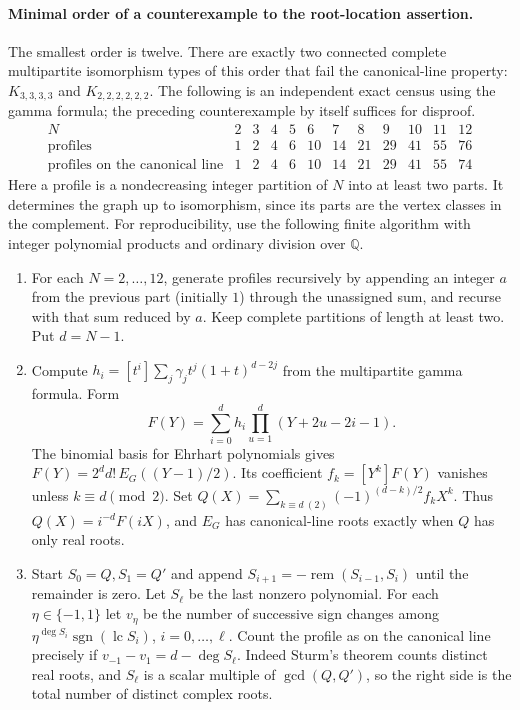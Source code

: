 \documentclass[11pt,a4paper]{article}
\theoremstyle{definition}\newtheorem{problem}[theorem]{Problem}
\begin{document}
\paragraph{Minimal order of a counterexample to the root-location assertion.}
The smallest order is twelve. There are exactly two connected complete multipartite isomorphism types of this order that fail the canonical-line property: $K_{3,3,3,3}$ and $K_{2,2,2,2,2,2}$. The following is an independent exact census using the gamma formula; the preceding counterexample by itself suffices for disproof.
\[
\begin{array}{c|rrrrrrrrrrr}
N&2&3&4&5&6&7&8&9&10&11&12\\\hline
\text{profiles}&1&2&4&6&10&14&21&29&41&55&76\\
\text{profiles on the canonical line}&1&2&4&6&10&14&21&29&41&55&74
\end{array}
\]
Here a profile is a nondecreasing integer partition of $N$ into at least two parts. It determines the graph up to isomorphism, since its parts are the vertex classes in the complement. For reproducibility, use the following finite algorithm with integer polynomial products and ordinary division over $\mathbb Q$.

\begin{enumerate}
\item For each $N=2,\ldots,12$, generate profiles recursively by appending an integer $a$ from the previous part (initially $1$) through the unassigned sum, and recurse with that sum reduced by $a$. Keep complete partitions of length at least two. Put $d=N-1$.
\item Compute $h_i=[t^i]\sum_j\gamma_jt^j(1+t)^{d-2j}$ from the multipartite gamma formula. Form
\[
 F(Y)=\sum_{i=0}^d h_i\prod_{u=1}^d(Y+2u-2i-1).
\]
The binomial basis for Ehrhart polynomials gives $F(Y)=2^d d!\,E_G((Y-1)/2)$. Its coefficient $f_k=[Y^k]F(Y)$ vanishes unless $k\equiv d\pmod 2$. Set $Q(X)=\sum_{k\equiv d\ (2)}(-1)^{(d-k)/2} f_kX^k$. Thus $Q(X)=i^{-d}F(iX)$, and $E_G$ has canonical-line roots exactly when $Q$ has only real roots.
\item Start $S_0=Q,S_1=Q'$ and append $S_{i+1}=-\operatorname{rem}(S_{i-1},S_i)$ until the remainder is zero. Let $S_\ell$ be the last nonzero polynomial. For each $\eta\in\{-1,1\}$ let $v_\eta$ be the number of successive sign changes among $\eta^{\deg S_i}\operatorname{sgn}(\operatorname{lc}S_i)$, $i=0,\ldots,\ell$. Count the profile as on the canonical line precisely if $v_{-1}-v_1=d-\deg S_\ell$. Indeed Sturm's theorem counts distinct real roots, and $S_\ell$ is a scalar multiple of $\gcd(Q,Q')$, so the right side is the total number of distinct complex roots.
\end{enumerate}
\end{document}
